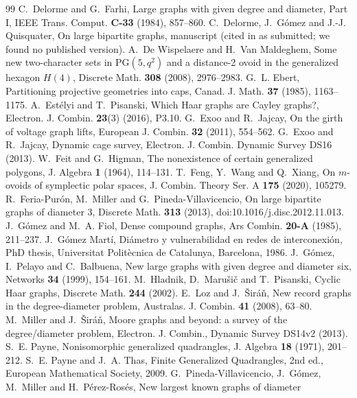 \documentclass[11pt]{amsart}
\theoremstyle{definition}
\theoremstyle{remark}
\numberwithin{equation}{section}
\newcommand{\PG}{\mathrm{PG}}
\begin{document}
\begin{thebibliography}{99}
 C.~Delorme and G.~Farhi, Large graphs with given degree and diameter, Part I, IEEE Trans. Comput.
\textbf{C-33} (1984), 857--860.
 C.~Delorme, J.~G\'omez and J.-J. Quisquater, On large bipartite graphs, manuscript (cited in \cite{CW} as
submitted; we found no published version).
 A.~De Wispelaere and H.~Van Maldeghem, Some new two-character sets in $\PG(5,q^2)$ and a distance-2 ovoid
in the generalized hexagon $H(4)$, Discrete Math. \textbf{308} (2008), 2976--2983.
 G.~L. Ebert, Partitioning projective geometries into caps, Canad. J. Math. \textbf{37} (1985), 1163--1175.
 A.~Est\'elyi and T.~Pisanski, Which Haar graphs are Cayley graphs?, Electron. J. Combin. \textbf{23}(3)
(2016), P3.10.
 G.~Exoo and R.~Jajcay, On the girth of voltage graph lifts, European J. Combin. \textbf{32} (2011), 554--562.
 G.~Exoo and R.~Jajcay, Dynamic cage survey, Electron. J. Combin. Dynamic Survey DS16 (2013).
 W.~Feit and G.~Higman, The nonexistence of certain generalized polygons, J. Algebra \textbf{1} (1964),
114--131.
 T.~Feng, Y.~Wang and Q.~Xiang, On $m$-ovoids of symplectic polar spaces, J. Combin. Theory Ser. A
\textbf{175} (2020), 105279.
 R.~Feria-Pur\'on, M.~Miller and G.~Pineda-Villavicencio, On large bipartite graphs of diameter 3, Discrete
Math. \textbf{313} (2013), doi:10.1016/j.disc.2012.11.013.
 J.~G\'omez and M.~A. Fiol, Dense compound graphs, Ars Combin. \textbf{20-A} (1985), 211--237.
 J.~G\'omez Mart\'i, Di\'ametro y vulnerabilidad en redes de interconexi\'on, PhD thesis, Universitat
Polit\`ecnica de Catalunya, Barcelona, 1986.
 J.~G\'omez, I.~Pelayo and C.~Balbuena, New large graphs with given degree and diameter six, Networks
\textbf{34} (1999), 154--161.
 M.~Hladnik, D.~Maru\v{s}i\v{c} and T.~Pisanski, Cyclic Haar graphs, Discrete Math. \textbf{244} (2002).
 E.~Loz and J.~\v{S}ir\'a\v{n}, New record graphs in the degree-diameter problem, Australas. J. Combin.
\textbf{41} (2008), 63--80.
 M.~Miller and J.~\v{S}ir\'a\v{n}, Moore graphs and beyond: a survey of the degree/diameter problem,
Electron. J. Combin., Dynamic Survey DS14v2 (2013).
 S.~E. Payne, Nonisomorphic generalized quadrangles, J. Algebra \textbf{18} (1971), 201--212.
 S.~E. Payne and J.~A. Thas, Finite Generalized Quadrangles, 2nd ed., European Mathematical Society, 2009.
 G.~Pineda-Villavicencio, J.~G\'omez, M.~Miller and H.~P\'erez-Ros\'es, New largest known graphs of diameter

\end{thebibliography}
\end{document}
